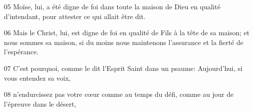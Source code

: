
05 Moïse, lui, a été digne de foi dans toute la maison de Dieu en qualité d’intendant, pour attester ce qui allait être dit.

06 Mais le Christ, lui, est digne de foi en qualité de Fils à la tête de sa maison; et nous sommes sa maison, si du moins nous maintenons l’assurance et la fierté de l’espérance.

07 C’est pourquoi, comme le dit l’Esprit Saint dans un psaume: Aujourd’hui, si vous entendez sa voix,

08 n’endurcissez pas votre cœur comme au temps du défi, comme au jour de l’épreuve dans le désert,
